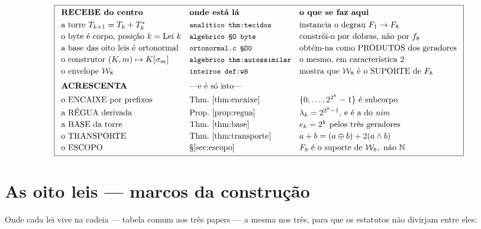 \documentclass[11pt,a4paper]{article}
\newcommand{\code}[1]{\texttt{\small #1}}
\newcommand{\Word}{\mathcal{W}}
\begin{document}
\[
\boxed{
\begin{array}{lll}
\textbf{RECEBE do centro} & \textbf{onde está lá} & \textbf{o que se faz aqui}\\[3pt]
\text{a torre }T_{k+1}=T_k+T_k^{*} & \code{analitico thm:tecidos} & \text{instancia o degrau }F_1\to F_8\\[2pt]
\text{o byte é corpo, posição }k=\text{Lei }k & \code{algebrico §O byte} & \text{constrói-o por dobras, não por }f_8\\[2pt]
\text{a base das oito leis é ortonormal} & \code{ortonormal.c §O0} & \text{obtém-na como PRODUTOS dos geradores}\\[2pt]
\text{o construtor }(K,m)\mapsto K[\sigma_m] & \code{algebrico thm:autossimilar} & \text{o mesmo, em característica }2\\[2pt]
\text{o envelope }\Word_8 & \code{inteiros def:w8} & \text{mostra que }\Word_8\text{ é o SUPORTE de }F_8\\[6pt]
\textbf{ACRESCENTA} & \multicolumn{2}{l}{\text{---e é só isto---}}\\[3pt]
\text{o ENCAIXE por prefixos} & \text{Thm.~\ref{thm:encaixe}} & \{0,\ldots,2^{2^k}-1\}\text{ é subcorpo}\\[2pt]
\text{a RÉGUA derivada} & \text{Prop.~\ref{prop:regua}} & \lambda_k=2^{2^{k}-1}\text{, e é a do \emph{nim}}\\[2pt]
\text{a BASE da torre} & \text{Thm.~\ref{thm:base}} & e_k=2^k\text{ pelos três geradores}\\[2pt]
\text{o TRANSPORTE} & \text{Thm.~\ref{thm:transporte}} & a+b=(a\oplus b)+2(a\wedge b)\\[2pt]
\text{o ESCOPO} & \text{§\ref{sec:escopo}} & F_8\text{ é o suporte de }\Word_8,\ \text{não }\mathbb{N}
\end{array}}
\]

\section{As oito leis --- marcos da construção}\label{sec:leis}

\noindent Onde cada lei vive na cadeia --- tabela comum aos três papers
--- a mesma nos três, para que os estatutos não divirjam entre eles:
\end{document}
